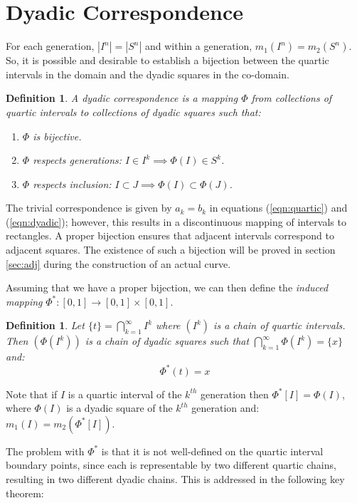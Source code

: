 \documentclass[letterpaper,12pt,fleqn,reqno]{amsart}
\newcommand{\uint}{[0,1]}
\newcommand{\usq}{\uint\times\uint}
\theoremstyle{plain}
\newtheorem{defn}[thm]{Definition}
\begin{document}
\section{Dyadic Correspondence}

For each generation, $|I^n|=|S^n|$ and within a generation, $m_1(I^n)=m_2(S^n)$.
So, it is possible and desirable to establish a bijection between the quartic
intervals in the domain and the dyadic squares in the co-domain.

\begin{defn}
A dyadic correspondence is a mapping $\Phi$ from collections of quartic
intervals to collections of dyadic squares such that:
\begin{enumerate}
\item $\Phi$ is bijective.
\item $\Phi$ respects generations: $I\in I^k\implies\Phi(I)\in S^k$.
\item $\Phi$ respects inclusion: $I\subset J\implies\Phi(I)\subset\Phi(J)$.
\end{enumerate}
\end{defn}

The trivial correspondence is given by $a_k=b_k$ in equations
(\ref{eqn:quartic}) and (\ref{eqn:dyadic}); however, this results in a
discontinuous mapping of intervals to rectangles. A proper bijection ensures
that adjacent intervals correspond to adjacent squares. The existence of such
a bijection will be proved in section \ref{sec:adj} during the construction of
an actual curve.

Assuming that we have a proper bijection, we can then define the
\emph{induced mapping} $\Phi^*:\uint\to\usq$.

\begin{defn}
Let $\{t\}=\bigcap_{k=1}^{\infty}I^k$ where $(I^k)$ is a chain of quartic
intervals. Then $(\Phi(I^k))$ is a chain of dyadic squares such that
$\bigcap_{k=1}^{\infty}\Phi(I^k)=\{x\}$ and:
\begin{equation}
\Phi^*(t)=x
\end{equation}
\end{defn}

Note that if $I$ is a quartic interval of the $k^{th}$ generation then
$\Phi^*[I]=\Phi(I)$, where $\Phi(I)$ is a dyadic square of the $k^{th}$
generation and: $m_1(I)=m_2(\Phi^*[I])$.

The problem with $\Phi^*$ is that it is not well-defined on the quartic
interval boundary points, since each is representable by two different quartic
chains, resulting in two different dyadic chains. This is addressed in the
following key theorem:
\end{document}
